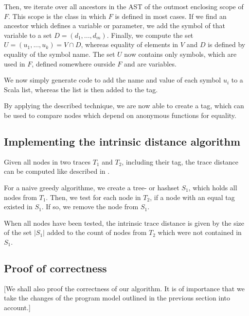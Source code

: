 Then, we iterate over all ancestors in the AST of the outmost enclosing scope of $F$. This scope is the class in which $F$ is defined in most cases. If we find an ancestor which defines a variable or parameter, we add the symbol of that variable to a set $D = (d_1, ..., d_m)$. Finally, we compute the set $U = (u_1, ..., u_k) = V \cap D$, whereas equality of elements in $V$ and $D$ is defined by equality of the symbol name. The set $U$ now contains only symbols, which are used in $F$, defined somewhere ourside $F$ and are variables. 

We now simply generate code to add the name and value of each symbol $u_i$ to a Scala list, whereas the list is then added to the tag. 

By applying the described technique, we are now able to create a tag, which can be used to compare nodes which depend on anonymous functions for equality. 

\subsection{Implementing the intrinsic distance algorithm}
Given all nodes in two traces $T_1$ and $T_2$, including their tag, the trace distance can be computed like described in \cite{Acar2005thesis}.  

For a naive greedy algorithme, we create a tree- or hashset $S_1$, which holds all nodes from $T_1$. Then, we test for each node in $T_2$, if a node with an equal tag existed in $S_1$. If so, we remove the node from $S_1$.

When all nodes have been tested, the intrinsic trace distance is given by the size of the set $|S_1|$ added to the count of nodes from $T_2$ which were not contained in $S_1$. 
\subsection{Proof of correctness}
[We shall also proof the correctness of our algorithm. It is of importance that we take the changes of the program model outlined in the previous section into account.]